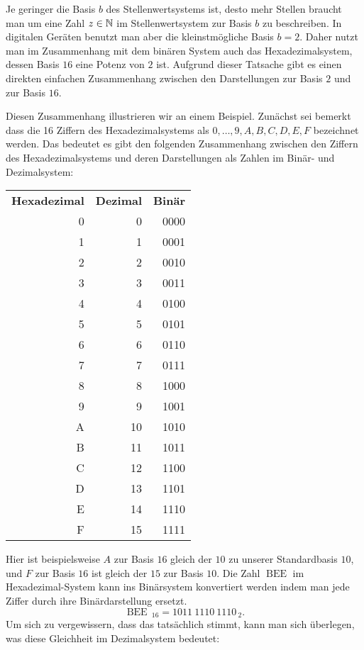 \begin{bsp}
	Je geringer die Basis $b$ des Stellenwertsystems ist, desto mehr Stellen braucht man um eine Zahl $z \in \mathbb{N}$ im Stellenwertsystem zur Basis $b$ zu beschreiben. In digitalen Geräten benutzt man aber die kleinstmögliche Basis $b=2$. Daher nutzt man im Zusammenhang mit dem binären System auch das Hexadezimalsystem, dessen Basis $16$ eine Potenz von $2$ ist. Aufgrund dieser Tatsache gibt es einen direkten einfachen Zusammenhang zwischen den Darstellungen zur  Basis $2$ und zur Basis $16$. 
	
	Diesen Zusammenhang illustrieren wir an einem Beispiel. Zunächst sei bemerkt dass die 16 Ziffern des Hexadezimalsystems als $0,\ldots,9,A,B,C,D,E,F$ bezeichnet werden. Das bedeutet es gibt den folgenden Zusammenhang zwischen den Ziffern des Hexadezimalsystems und deren Darstellungen als Zahlen im Binär- und Dezimalsystem: 
	\begin{center}
		\small
		\begin{tabular}{rrr}
			\textbf{Hexadezimal} & \textbf{Dezimal} & \textbf{Binär}
			\\ 0 & 0 & 0000
			\\ 1 & 1 & 0001
			\\ 2 & 2 & 0010
			\\ 3 & 3 & 0011
			\\ 4 & 4 & 0100
			\\ 5 & 5 & 0101
			\\ 6 & 6 & 0110
			\\ 7 & 7 & 0111
			\\ 8 & 8 & 1000
			\\ 9 & 9 & 1001
			\\ A & 10 & 1010
			\\ B & 11 & 1011
			\\ C & 12 & 1100
			\\ D & 13 & 1101
			\\ E & 14 & 1110
			\\ F & 15 & 1111
		\end{tabular}
	\end{center}
	Hier ist beispielsweise $A$ zur Basis $16$ gleich der $10$ zu unserer Standardbasis $10$, und $F$ zur Basis $16$ ist gleich der $15$ zur Basis $10$. Die Zahl $\operatorname{BEE}$ im Hexadezimal-System kann ins Binärsystem konvertiert werden indem man jede Ziffer durch ihre Binärdarstellung ersetzt. 
	\[
	\operatorname{BEE} \, {}_{16} = 1011 \ 1110 \ 1110 \, {}_{2}.
	\]
	Um sich zu vergewissern, dass das tatsächlich stimmt, kann man sich überlegen, was diese Gleichheit im Dezimalsystem bedeutet:

\end{bsp}
